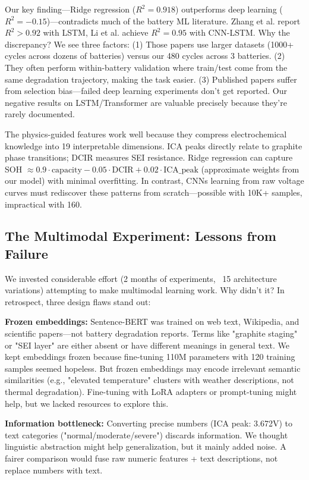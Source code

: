 \documentclass{sn-jnl}
\begin{document}
Our key finding—Ridge regression ($R^2 = 0.918$) outperforms deep learning ($R^2 = -0.15$)—contradicts much of the battery ML literature. Zhang et al. \citep{zhang2018} report $R^2 > 0.92$ with LSTM, Li et al. \citep{li2019} achieve $R^2 = 0.95$ with CNN-LSTM. Why the discrepancy? We see three factors: (1) Those papers use larger datasets (1000+ cycles across dozens of batteries) versus our 480 cycles across 3 batteries. (2) They often perform within-battery validation where train/test come from the same degradation trajectory, making the task easier. (3) Published papers suffer from selection bias—failed deep learning experiments don't get reported. Our negative results on LSTM/Transformer are valuable precisely because they're rarely documented.

The physics-guided features work well because they compress electrochemical knowledge into 19 interpretable dimensions. ICA peaks directly relate to graphite phase transitions; DCIR measures SEI resistance. Ridge regression can capture SOH $\approx 0.9 \cdot \text{capacity} - 0.05 \cdot \text{DCIR} + 0.02 \cdot \text{ICA\_peak}$ (approximate weights from our model) with minimal overfitting. In contrast, CNNs learning from raw voltage curves must rediscover these patterns from scratch—possible with 10K+ samples, impractical with 160.

\subsection{The Multimodal Experiment: Lessons from Failure}
\label{subsec:multimodal_discussion}

We invested considerable effort (2 months of experiments, ~15 architecture variations) attempting to make multimodal learning work. Why didn't it? In retrospect, three design flaws stand out:

\textbf{Frozen embeddings:} Sentence-BERT was trained on web text, Wikipedia, and scientific papers—not battery degradation reports. Terms like "graphite staging" or "SEI layer" are either absent or have different meanings in general text. We kept embeddings frozen because fine-tuning 110M parameters with 120 training samples seemed hopeless. But frozen embeddings may encode irrelevant semantic similarities (e.g., "elevated temperature" clusters with weather descriptions, not thermal degradation). Fine-tuning with LoRA adapters or prompt-tuning might help, but we lacked resources to explore this.

\textbf{Information bottleneck:} Converting precise numbers (ICA peak: 3.672V) to text categories ("normal/moderate/severe") discards information. We thought linguistic abstraction might help generalization, but it mainly added noise. A fairer comparison would fuse raw numeric features + text descriptions, not replace numbers with text.
\end{document}
